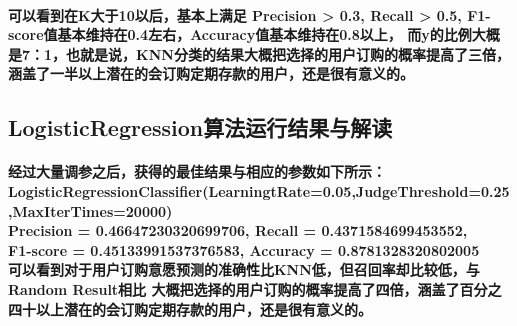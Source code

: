 \documentclass{ctexart}
\begin{document}
    \paragraph{
        可以看到在K大于10以后，基本上满足 Precision > 0.3, Recall > 0.5, F1-score值基本维持在0.4左右，Accuracy值基本维持在0.8以上，
        而y的比例大概是7：1，也就是说，KNN分类的结果大概把选择的用户订购的概率提高了三倍，涵盖了一半以上潜在的会订购定期存款的用户，还是很有意义的。
    }
    \subsection{LogisticRegression算法运行结果与解读}
    \paragraph{
        经过大量调参之后，获得的最佳结果与相应的参数如下所示：\\
        LogisticRegressionClassifier(LearningtRate=0.05,JudgeThreshold=0.25,MaxIterTimes=20000) \\
        Precision = 0.46647230320699706, Recall = 0.4371584699453552, \\
        F1-score = 0.45133991537376583, Accuracy = 0.8781328320802005\\
        可以看到对于用户订购意愿预测的准确性比KNN低，但召回率却比较低，与Random Result相比
        大概把选择的用户订购的概率提高了四倍，涵盖了百分之四十以上潜在的会订购定期存款的用户，还是很有意义的。
    }
\end{document}
